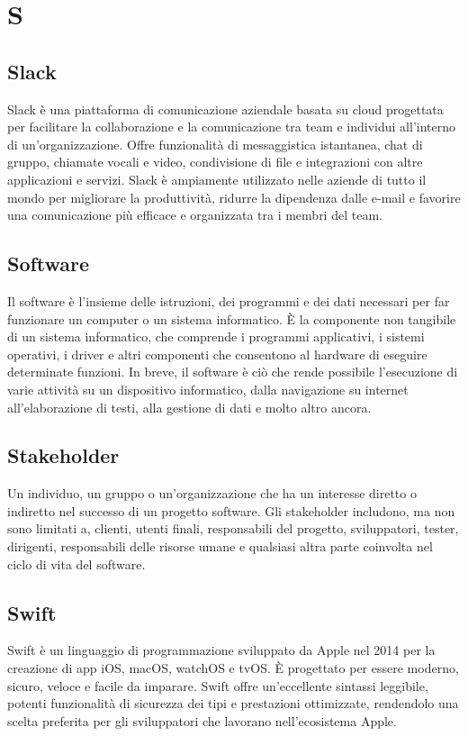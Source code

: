 \documentclass{article}
\begin{document}
\section{S}
\subsection{Slack}
Slack è una piattaforma di comunicazione aziendale basata su cloud progettata per facilitare la collaborazione e la comunicazione tra team e individui all'interno di un'organizzazione. Offre funzionalità di messaggistica istantanea, chat di gruppo, chiamate vocali e video, condivisione di file e integrazioni con altre applicazioni e servizi. Slack è ampiamente utilizzato nelle aziende di tutto il mondo per migliorare la produttività, ridurre la dipendenza dalle e-mail e favorire una comunicazione più efficace e organizzata tra i membri del team.

\subsection{Software}
Il software è l'insieme delle istruzioni, dei programmi e dei dati necessari per far funzionare un computer o un sistema informatico. È la componente non tangibile di un sistema informatico, che comprende i programmi applicativi, i sistemi operativi, i driver e altri componenti che consentono al hardware di eseguire determinate funzioni. In breve, il software è ciò che rende possibile l'esecuzione di varie attività su un dispositivo informatico, dalla navigazione su internet all'elaborazione di testi, alla gestione di dati e molto altro ancora.

\subsection{Stakeholder}
Un individuo, un gruppo o un'organizzazione che ha un interesse diretto o indiretto nel successo di un progetto software. Gli stakeholder includono, ma non sono limitati a, clienti, utenti finali, responsabili del progetto, sviluppatori, tester, dirigenti, responsabili delle risorse umane e qualsiasi altra parte coinvolta nel ciclo di vita del software.

\subsection{Swift}
Swift è un linguaggio di programmazione sviluppato da Apple nel 2014 per la creazione di app iOS, macOS, watchOS e tvOS. È progettato per essere moderno, sicuro, veloce e facile da imparare. Swift offre un'eccellente sintassi leggibile, potenti funzionalità di sicurezza dei tipi e prestazioni ottimizzate, rendendolo una scelta preferita per gli sviluppatori che lavorano nell'ecosistema Apple.
\end{document}
